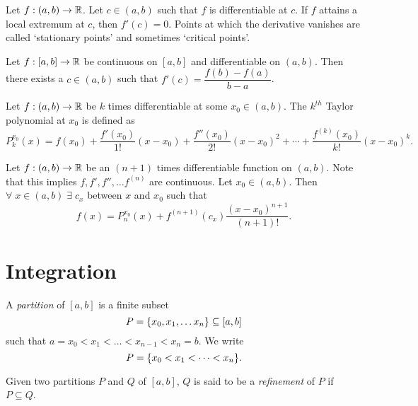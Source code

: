 \documentclass[12pt]{article}
\begin{document}
\begin{thm} \label{thm:stationary extrema}
    Let $f : (a, b) \to \mathbb{R}$.
    Let $c \in (a, b)$ such that $f$ is differentiable at $c$.
    If $f$ attains a local extremum at $c$, then $f'(c) = 0$.
    Points at which the derivative vanishes are called `stationary points' and sometimes `critical points'.
\end{thm}

\begin{thm} \label{thm:mvt}
    Let $f : [a, b] \to \mathbb{R}$ be continuous on $[a, b]$ and differentiable on $(a, b)$. Then there exists a $c \in (a, b)$ such that $f'(c) = \dfrac{f(b) - f(a)}{b - a}$.
\end{thm}

\begin{defn} \label{defn:taylor}
    Let $f : (a, b) \to \mathbb{R}$ be $k$ times differentiable at some $x_{0} \in (a, b)$. The $k^{th}$ Taylor polynomial at $x_{0}$ is defined as \[
        P_{k}^{x_{0}}(x) = f(x_{0}) + \frac{f'(x_{0})}{1!}(x - x_{0}) + \frac{f''(x_{0})}{2!}(x - x_{0})^{2} + \cdots + \frac{f^{(k)}(x_{0})}{k!}(x - x_{0})^{k}.
    \]
\end{defn}

\begin{thm} \label{thm:taylor}
    Let $f : (a, b) \to \mathbb{R}$ be an $(n + 1)$ times differentiable function on $(a, b)$.
    Note that this implies $f, f', f'', \dots f^{(n)}$ are continuous.
    Let $x_{0} \in (a, b)$.
    Then $\forall\; x \in (a, b) \;\exists\; c_{x}$ between $x$ and $x_{0}$ such that \[
        f(x) = P_{n}^{x_{0}}(x) + f^{(n+1)}(c_{x}) \frac{(x - x_{0})^{n+1}}{(n+1)!}.
    \]
\end{thm}

\section{Integration}

\begin{defn}[Partition] \label{defn:partition}
    A \emph{partition} of $[a, b]$ is a finite subset \[
        P = \set{x_{0}, x_{1}, \dots x_{n}} \subseteq [a, b]
    \] such that $a = x_{0} < x_{1} < \dots < x_{n-1} < x_{n} = b$.
    We write \[
        P = \set{x_{0} < x_{1} < \dots < x_{n}}.
    \]
\end{defn}

\begin{defn}[Refinement] \label{defn:refinement}
    Given two partitions $P$ and $Q$ of $[a, b]$, $Q$ is said to be a \emph{refinement} of $P$ if $P \subseteq Q$.
    
\end{defn}
\end{document}
